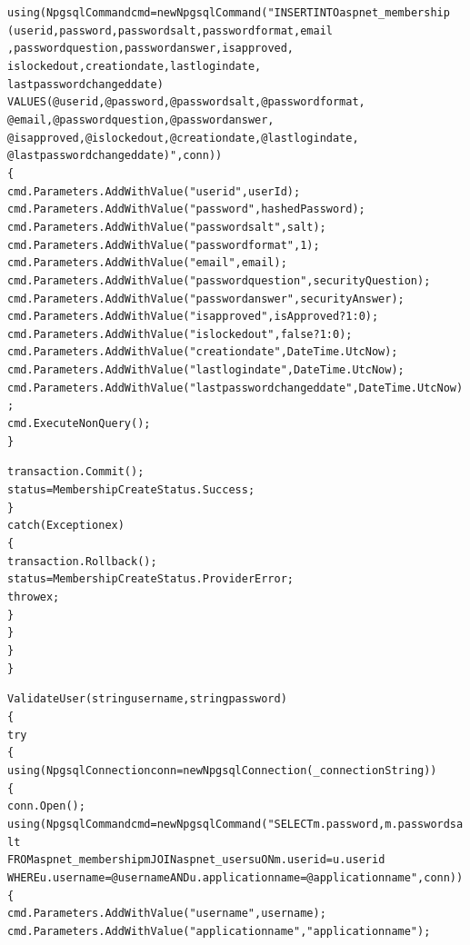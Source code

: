 \documentclass[14pt]{article}
\begin{document}
\begin{mdframed}[backgroundcolor=white, linecolor=black, roundcorner=5pt]
\begin{alltt}
                using (NpgsqlCommand cmd = new NpgsqlCommand("INSERT INTO aspnet_membership 
                (userid, password, passwordsalt, passwordformat, email
                , passwordquestion, passwordanswer, isapproved,
                islockedout, creationdate, lastlogindate,
                lastpasswordchangeddate) 
                VALUES (@userid, @password, @passwordsalt, @passwordformat,
                @email, @passwordquestion, @passwordanswer,
                @isapproved, @islockedout, @creationdate, @lastlogindate,
                @lastpasswordchangeddate)", conn))
                \{
                    cmd.Parameters.AddWithValue("userid", userId);
                    cmd.Parameters.AddWithValue("password", hashedPassword);
                    cmd.Parameters.AddWithValue("passwordsalt", salt);
                    cmd.Parameters.AddWithValue("passwordformat", 1);
                    cmd.Parameters.AddWithValue("email", email);
                    cmd.Parameters.AddWithValue("passwordquestion", securityQuestion);
                    cmd.Parameters.AddWithValue("passwordanswer", securityAnswer);
                    cmd.Parameters.AddWithValue("isapproved", isApproved ? 1 : 0);
                    cmd.Parameters.AddWithValue("islockedout", false ? 1 : 0);
                    cmd.Parameters.AddWithValue("creationdate", DateTime.UtcNow);
                    cmd.Parameters.AddWithValue("lastlogindate", DateTime.UtcNow);
                    cmd.Parameters.AddWithValue("lastpasswordchangeddate", DateTime.UtcNow);
                    cmd.ExecuteNonQuery();
                \}

                transaction.Commit();
                status = MembershipCreateStatus.Success;
            \}
            catch (Exception ex)
            \{
                transaction.Rollback();
                status = MembershipCreateStatus.ProviderError;
                throw ex;
            \}
        \}
    \}
\}

ValidateUser(string username, string password)
\{
    try
    \{
        using (NpgsqlConnection conn = new NpgsqlConnection(_connectionString))
        \{
            conn.Open();
            using (NpgsqlCommand cmd = new NpgsqlCommand("SELECT m.password, m.passwordsalt 
            FROM aspnet_membership m JOIN aspnet_users u ON m.userid = u.userid 
            WHERE u.username = @username AND u.applicationname = @applicationname", conn))
            \{
                cmd.Parameters.AddWithValue("username", username);
                cmd.Parameters.AddWithValue("applicationname", "applicationname");


\end{alltt}
\end{mdframed}
\end{document}
